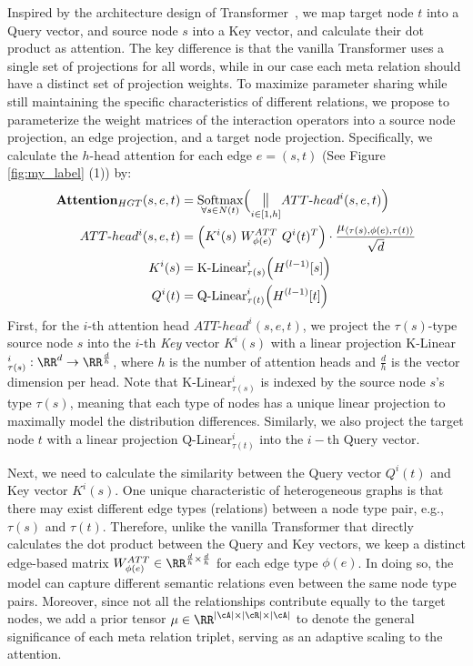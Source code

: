 \documentclass[sigconf]{acmart}
\theoremstyle{definition}
\begin{document}
Inspired by the architecture design of Transformer~\cite{DBLP:conf/nips/VaswaniSPUJGKP17}, we  map target node $t$ into a Query vector, and source node $s$ into a Key vector, and calculate their dot product as attention. The key difference is that the vanilla Transformer uses a single set of projections for all words, while in our case each meta relation should have a distinct set of projection weights. To maximize parameter sharing while still maintaining the specific characteristics of different relations, we propose to parameterize the weight matrices of the interaction operators into a source node projection, an edge projection, and a target node projection. Specifically, we calculate the $h$-head {attention} for each edge $e=(s,t)$ (See Figure \ref{fig:my_label} (1)) by:
\begin{align}
\label{eq:hgt-att}
\textbf{Attention}_{HGT}(s,e,t)&  = \underset{\forall s \in N(t)}{\text{Softmax}}\Big(\underset{i \in [1,h]}{\mathlarger{\mathbin\Vert}}ATT\text{-}head^{i}(s,e,t)\Big)\\
ATT\text{-}head^{i}(s,e,t)&  = \Big(K^i(s)\ W^{ATT}_{\phi(e)}\ Q^i(t)^T\Big) \cdot \frac{{\mu}_{\langle \tau(s), \phi(e), \tau(t) \rangle}}{\sqrt{d}} \nonumber\\
K^i(s)&  = \text{K-Linear}^i_{\tau(s)}\Big({H}^{(l-1)}[s]\Big) \nonumber\\
Q^i(t)&  = \text{Q-Linear}^i_{\tau(t)}\Big(H^{(l-1)}[t]\Big) \nonumber
\end{align}
First, for the $i$-th attention head $ATT\text{-}head^{i}(s,e,t)$, we project the $\tau(s)$-type source node $s$ into the $i$-th \textit{Key} vector $K^i(s)$ with a linear projection K-Linear$^i_{\tau(s)}: \RR^{d} \rightarrow \RR^{\frac{d}{h}}$, where $h$ is the number of attention heads and $\frac{d}{h}$ is the vector dimension per head. 
Note that K-Linear$^i_{\tau(s)}$ is indexed by the source node $s$'s type $\tau(s)$, meaning that each type of nodes has a unique linear projection to maximally model the distribution differences. 
Similarly, we also project the target node $t$ with a linear projection Q-Linear$^i_{\tau(t)}$ into the $i-$th Query vector. 



Next, we need to calculate the similarity between the Query vector $Q^i(t)$ and Key vector $K^i(s)$. 
One unique characteristic of heterogeneous graphs is that there may exist different edge types (relations) between a node type pair, e.g., $\tau(s)$ and $\tau(t)$. 
Therefore, unlike the vanilla Transformer that directly calculates the dot product between the Query and Key vectors, we keep a distinct edge-based matrix $W^{ATT}_{\phi(e)}\in\RR^{\frac{d}{h}\times\frac{d}{h}}$ for each edge type $\phi(e)$. In doing so, the model can capture different semantic relations even between the same node type pairs. 
Moreover, since not all the relationships contribute equally to the target nodes, 
we add a prior tensor $\mu \in \RR^{|\cA|\times|\cR|\times|\cA|}$ to denote the general significance of each meta relation triplet, serving as an adaptive scaling to the attention. 
\end{document}
